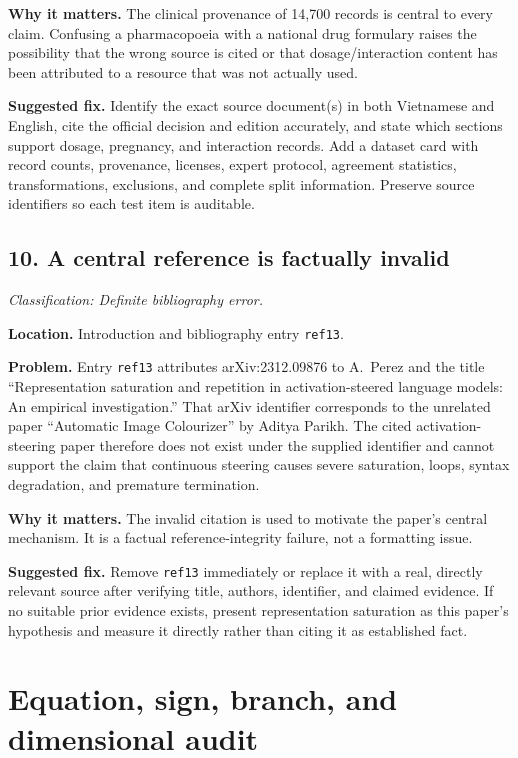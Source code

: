 \documentclass[11pt]{article}
\newcommand{\findinglabel}[1]{\textbf{#1}}
\newcommand{\classification}[1]{\textit{Classification: #1.}}
\begin{document}
\findinglabel{Why it matters.} The clinical provenance of 14,700 records is central to every claim.  Confusing a pharmacopoeia with a national drug formulary raises the possibility that the wrong source is cited or that dosage/interaction content has been attributed to a resource that was not actually used.

\findinglabel{Suggested fix.} Identify the exact source document(s) in both Vietnamese and English, cite the official decision and edition accurately, and state which sections support dosage, pregnancy, and interaction records.  Add a dataset card with record counts, provenance, licenses, expert protocol, agreement statistics, transformations, exclusions, and complete split information.  Preserve source identifiers so each test item is auditable.

\subsection*{10. A central reference is factually invalid}

\classification{Definite bibliography error}

\findinglabel{Location.} Introduction and bibliography entry \texttt{ref13}.

\findinglabel{Problem.} Entry \texttt{ref13} attributes arXiv:2312.09876 to A.~Perez and the title ``Representation saturation and repetition in activation-steered language models: An empirical investigation.''  That arXiv identifier corresponds to the unrelated paper ``Automatic Image Colourizer'' by Aditya Parikh.  The cited activation-steering paper therefore does not exist under the supplied identifier and cannot support the claim that continuous steering causes severe saturation, loops, syntax degradation, and premature termination.

\findinglabel{Why it matters.} The invalid citation is used to motivate the paper's central mechanism.  It is a factual reference-integrity failure, not a formatting issue.

\findinglabel{Suggested fix.} Remove \texttt{ref13} immediately or replace it with a real, directly relevant source after verifying title, authors, identifier, and claimed evidence.  If no suitable prior evidence exists, present representation saturation as this paper's hypothesis and measure it directly rather than citing it as established fact.

\section*{Equation, sign, branch, and dimensional audit}
\end{document}

